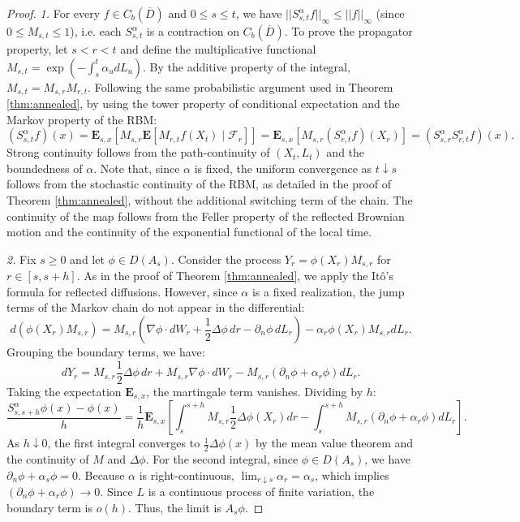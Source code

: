 \documentclass[11pt]{amsart}
\theoremstyle{plain}
\theoremstyle{definition}
\theoremstyle{remark}
\begin{document}
\begin{proof}
	\emph{1.} For every $f\in C_b(\overline D)$ and $0\le s\le t$, we have $\vert \vert S_{s,t}^\alpha f\vert \vert_\infty \le \vert \vert f\vert \vert_\infty$ (since \( 0 \leq M_{s,t} \leq 1\)), i.e. each $S_{s,t}^\alpha$ is a contraction on $C_b(\overline D)$. To prove the propagator property, let $s < r < t$ and define the multiplicative functional $M_{s,t} = \exp(-\int_s^t \alpha_u dL_u)$. By the additive property of the integral, $M_{s,t} = M_{s,r} M_{r,t}$. Following the same probabilistic argument used in Theorem \ref{thm:annealed}, by using the tower property of conditional expectation and the Markov property of the RBM:$$(S_{s,t}^\alpha f)(x) = \mathbf{E}_{s,x} \left[ M_{s,r} \mathbf{E} [M_{r,t} f(X_t) \mid \mathcal{F}_r] \right] = \mathbf{E}_{s,x} \left[ M_{s,r} (S_{r,t}^\alpha f)(X_r) \right] = (S_{s,r}^\alpha S_{r,t}^\alpha f)(x).$$Strong continuity follows from the path-continuity of $(X_t, L_t)$ and the boundedness of $\alpha$. Note that, since $\alpha$ is fixed, the uniform convergence as $t \downarrow s$ follows from the stochastic continuity of the RBM, as detailed in the proof of Theorem \ref{thm:annealed}, without the additional switching term of the chain. The continuity of the map follows from the Feller property of the reflected Brownian motion and the continuity of the exponential functional of the local time.
	
	\emph{2.} Fix $s \ge 0$ and let $\phi \in D(A_s)$. Consider the process $Y_r = \phi(X_r) M_{s,r}$ for $r \in [s, s+h]$. As in the proof of Theorem \ref{thm:annealed}, we apply the It\^o's formula for reflected diffusions. However, since $\alpha$ is a fixed realization, the jump terms of the Markov chain do not appear in the differential:$$d(\phi(X_r) M_{s,r}) = M_{s,r} \left( \nabla \phi \cdot dW_r + \frac{1}{2}\Delta \phi \, dr - \partial_n \phi \, dL_r \right) - \alpha_r \phi(X_r) M_{s,r} dL_r.$$Grouping the boundary terms, we have:$$dY_r = M_{s,r} \frac{1}{2}\Delta \phi \, dr + M_{s,r} \nabla \phi \cdot dW_r - M_{s,r} (\partial_n \phi + \alpha_r \phi) dL_r.$$Taking the expectation $\mathbf{E}_{s,x}$, the martingale term vanishes. Dividing by $h$:$$\frac{S_{s,s+h}^\alpha \phi(x) - \phi(x)}{h} = \frac{1}{h} \mathbf{E}_{s,x} \left[ \int_s^{s+h} M_{s,r} \frac{1}{2}\Delta \phi(X_r) dr - \int_s^{s+h} M_{s,r} (\partial_n \phi + \alpha_r \phi) dL_r \right].$$As $h \downarrow 0$, the first integral converges to $\frac{1}{2}\Delta \phi(x)$ by the mean value theorem and the continuity of $M$ and $\Delta \phi$. For the second integral, since $\phi \in D(A_s)$, we have $\partial_n \phi + \alpha_s \phi = 0$. Because $\alpha$ is right-continuous, $\lim_{r \downarrow s} \alpha_r = \alpha_s$, which implies $(\partial_n \phi + \alpha_r \phi) \to 0$. Since $L$ is a continuous process of finite variation, the boundary term is $o(h)$. Thus, the limit is $A_s \phi$.
	

\end{proof}
\end{document}
